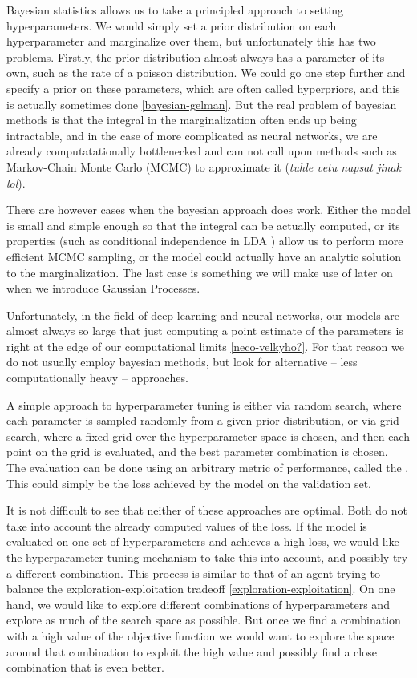 Bayesian statistics allows us to take a principled approach to setting
hyperparameters. We would simply set a prior distribution on each
hyperparameter and marginalize over them, but unfortunately this has two
problems. Firstly, the prior distribution almost always has a parameter of its
own, such as the rate of a poisson distribution. We could go one step further
and specify a prior on these parameters, which are often called hyperpriors,
and this is actually sometimes done \ref{bayesian-gelman}. But the real problem
of bayesian methods is that the integral in the marginalization often ends up
being intractable, and in the case of more complicated as neural networks, we
are already computatationally bottlenecked and can not call upon methods such
as Markov-Chain Monte Carlo (MCMC) to approximate it (\emph{tuhle vetu napsat
jinak lol}).

There are however cases when the bayesian approach does work. Either the model
is small and simple enough so that the integral can be actually computed, or
its properties (such as conditional independence in LDA \citep{lda-blei2003latent}) allow us to
perform more efficient MCMC sampling, or the model could actually have an
analytic solution to the marginalization. The last case is something we will
make use of later on when we introduce Gaussian Processes.

Unfortunately, in the field of deep learning \citep{dlbook} and neural networks, our
models are almost always so large that just computing a point estimate of the
parameters is right at the edge of our computational limits
\ref{neco-velkyho?}. For that reason we do not usually employ bayesian methods,
but look for alternative -- less computationally heavy -- approaches.

A simple approach to hyperparameter tuning is either via random search, where
each parameter is sampled randomly from a given prior distribution, or via grid
search, where a fixed grid over the hyperparameter space is chosen, and then
each point on the grid is evaluated, and the best parameter combination is
chosen. The evaluation can be done using an arbitrary metric of performance,
called the . This could simply be the loss
achieved by the model on the validation set.

It is not difficult to see that neither of these approaches are optimal.  Both
do not take into account the already computed values of the loss. If the model
is evaluated on one set of hyperparameters and achieves a high loss, we would
like the hyperparameter tuning mechanism to take this into account, and
possibly try a different combination. This process is similar to that of an
agent trying to balance the exploration-exploitation tradeoff
\ref{exploration-exploitation}. On one hand, we would like to explore different
combinations of hyperparameters and explore as much of the search space as
possible.  But once we find a combination with a high value of the objective
function we would want to explore the space around that combination to exploit
the high value and possibly find a close combination that is even better.

